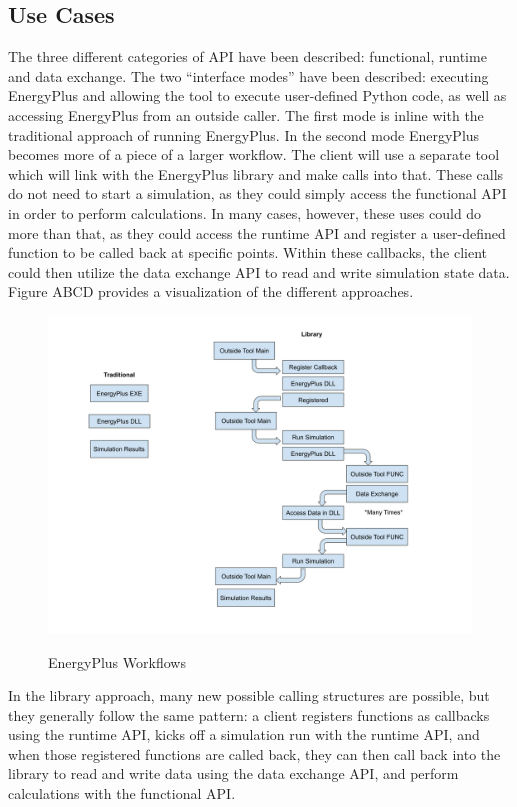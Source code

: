 \documentclass[5p]{elsarticle}
\begin{document}
  \subsection{Use Cases}
The three different categories of API have been described: functional, runtime and data exchange.  The two “interface modes” have been described: executing EnergyPlus and allowing the tool to execute user-defined Python code, as well as accessing EnergyPlus from an outside caller.  The first mode is inline with the traditional approach of running EnergyPlus.  In the second mode EnergyPlus becomes more of a piece of a larger workflow.  The client will use a separate tool which will link with the EnergyPlus library and make calls into that.  These calls do not need to start a simulation, as they could simply access the functional API in order to perform calculations.  In many cases, however, these uses could do more than that, as they could access the runtime API and register a user-defined function to be called back at specific points.  Within these callbacks, the client could then utilize the data exchange API to read and write simulation state data.  Figure ABCD provides a visualization of the different approaches.

\begin{figure}
\begin{center}
\label{figure:api:uses:workflows}
\includegraphics[width=\columnwidth]{images/api_workflows.png}
\caption{EnergyPlus Workflows}
\end{center}
\end{figure}

In the library approach, many new possible calling structures are possible, but they generally follow the same pattern: a client registers functions as callbacks using the runtime API, kicks off a simulation run with the runtime API, and when those registered functions are called back, they can then call back into the library to read and write data using the data exchange API, and perform calculations with the functional API.
\end{document}
